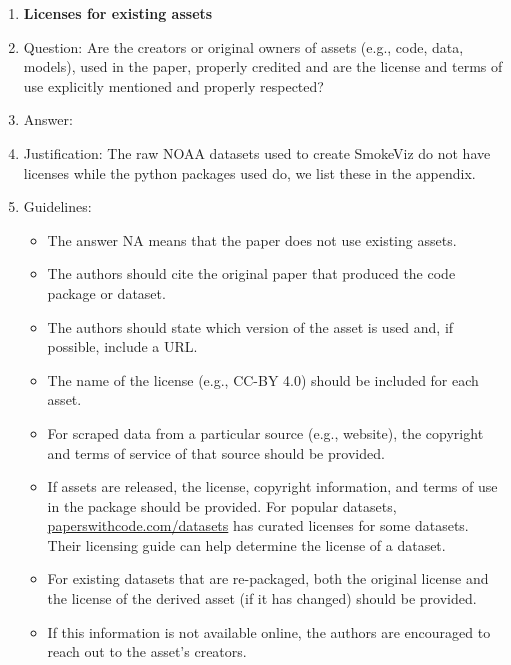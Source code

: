 \documentclass{article}
\begin{document}
\begin{enumerate}
\item {\bf Licenses for existing assets}
    \item[] Question: Are the creators or original owners of assets (e.g., code, data, models), used in the paper, properly credited and are the license and terms of use explicitly mentioned and properly respected?
    \item[] Answer: \answerYes{} %
    \item[] Justification: The raw NOAA datasets used to create SmokeViz do not have licenses while the python packages used do, we list these in the appendix.
    \item[] Guidelines:
    \begin{itemize}
        \item The answer NA means that the paper does not use existing assets.
        \item The authors should cite the original paper that produced the code package or dataset.
        \item The authors should state which version of the asset is used and, if possible, include a URL.
        \item The name of the license (e.g., CC-BY 4.0) should be included for each asset.
        \item For scraped data from a particular source (e.g., website), the copyright and terms of service of that source should be provided.
        \item If assets are released, the license, copyright information, and terms of use in the package should be provided. For popular datasets, \url{paperswithcode.com/datasets} has curated licenses for some datasets. Their licensing guide can help determine the license of a dataset.
        \item For existing datasets that are re-packaged, both the original license and the license of the derived asset (if it has changed) should be provided.
        \item If this information is not available online, the authors are encouraged to reach out to the asset's creators.
    \end{itemize}


\end{enumerate}
\end{document}
